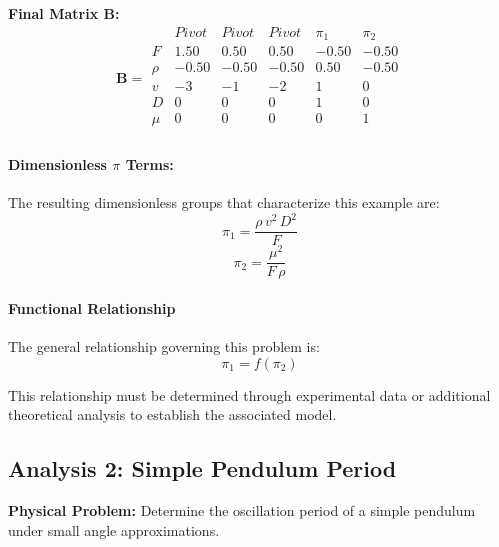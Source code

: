         \textbf{Final Matrix $\mathbf{B}$:}
        \[\mathbf{B} = \begin{array}{r|rrrrr}
        & Pivot & Pivot & Pivot & \pi_{1} & \pi_{2} \\
        \hline
        F & 1.50 & 0.50 & 0.50 & -0.50 & -0.50 \\
\rho & -0.50 & -0.50 & -0.50 & 0.50 & -0.50 \\
v & -3 & -1 & -2 & 1 & 0 \\
D & 0 & 0 & 0 & 1 & 0 \\
\mu & 0 & 0 & 0 & 0 & 1 \\

        \end{array}\]

        \paragraph{Dimensionless $\pi$ Terms: }
        The resulting dimensionless groups that characterize this example are:
\begin{equation}
\pi_{1} = \frac{\rho \, v^{2} \, D^{2}}{F}
\end{equation}
\begin{equation}
\pi_{2} = \frac{\mu^{2}}{F \, \rho}
\end{equation}

                    \paragraph{Functional Relationship}
                    The general relationship governing this problem is:
                    \begin{equation}
                    \pi_1 = f(\pi_2)
                    \end{equation}

                    This relationship must be determined through experimental data or additional theoretical analysis to establish the associated model.


\subsection{Analysis 2: Simple Pendulum Period}
\label{sec:Simple_Pendulum_Period}

\begin{problembox}
\textbf{Physical Problem:} Determine the oscillation period of a simple pendulum under small angle approximations.
\end{problembox}

